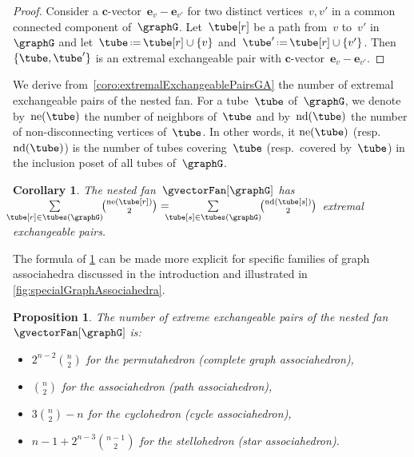 \documentclass{amsart}
\newtheorem{corollary}[theorem]{Corollary}
\newtheorem{proposition}[theorem]{Proposition}
\theoremstyle{definition}
\renewcommand{\b}[1]{{\boldsymbol{#1}}} %
\newcommand{\eqdef}{\mbox{\,\raisebox{0.2ex}{\scriptsize\ensuremath{\mathrm:}}\ensuremath{=}\,}} %
\newcommand{\nonDisconnecting}{\mathrm{nd}} %
\newcommand{\neighbors}{\mathrm{ne}} %
\begin{document}
\begin{proof}
Consider a $\b{c}$-vector~$\b{e}_v - \b{e}_{v'}$ for two distinct vertices~$v, v'$ in a common connected component of~$\graphG$. Let~$\tube[r]$ be a path from~$v$ to~$v'$ in~$\graphG$ and let~$\tube \eqdef \tube[r] \cup \{v\}$ and~$\tube' \eqdef \tube[r] \cup \{v'\}$. Then $\{\tube, \tube'\}$ is an extremal exchangeable pair with $\b{c}$-vector~$\b{e}_v - \b{e}_{v'}$.
\end{proof}

We derive from~\cref{coro:extremalExchangeablePairsGA} the number of extremal exchangeable pairs of the nested fan.
For a tube~$\tube$ of~$\graphG$, we denote by~$\neighbors(\tube)$ the number of neighbors of~$\tube$ and by~$\nonDisconnecting(\tube)$ the number of non-disconnecting vertices of~$\tube$.
In other words, it $\neighbors(\tube)$ (resp.~$\nonDisconnecting(\tube)$) is the number of tubes covering~$\tube$ (resp.~covered by~$\tube$) in the inclusion poset of all tubes of~$\graphG$.

\begin{corollary}
\label{coro:numberExtremalExchangeablePairsGA}
The nested fan~$\gvectorFan[\graphG]$ has~$\!\!\!\! \sum\limits_{\tube[r] \in \tubes(\graphG)} \!\! \binom{\neighbors(\tube[r])}{2} = \!\!\!\! \sum\limits_{\tube[s] \in \tubes(\graphG)} \!\! \binom{\nonDisconnecting(\tube[s])}{2}$ extremal exchangeable pairs.
\end{corollary}


The formula of \cref{coro:numberExtremalExchangeablePairsGA} can be made more explicit for specific families of graph associahedra discussed in the introduction and illustrated in \cref{fig:specialGraphAssociahedra}.

\begin{proposition}
The number of extreme exchangeable pairs of the nested fan~$\gvectorFan[\graphG]$ is:
\begin{itemize}
\item $2^{n-2}\binom{n}{2}$ for the permutahedron (complete graph associahedron),
\item $\binom{n}{2}$ for the associahedron (path associahedron),
\item $3\binom{n}{2} - n$ for the cyclohedron (cycle associahedron),
\item $n-1+2^{n-3}\binom{n-1}{2}$ for the stellohedron (star associahedron).
\end{itemize}
\end{proposition}
\end{document}

